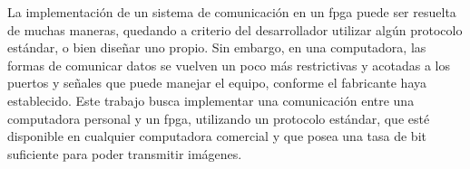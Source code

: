 %
%

La implementación de un sistema de comunicación en un \acrshort{fpga} puede ser resuelta de muchas maneras, quedando a criterio del desarrollador utilizar algún protocolo estándar, o bien diseñar uno propio. Sin embargo, en una computadora, las formas de comunicar datos se vuelven un poco más restrictivas y acotadas a los puertos y señales que puede manejar el equipo, conforme el fabricante haya establecido.
Este trabajo busca implementar una comunicación entre una computadora personal y un \acrshort{fpga}, utilizando un protocolo estándar, que esté disponible en cualquier computadora comercial y que posea una tasa de bit suficiente para poder transmitir imágenes.


